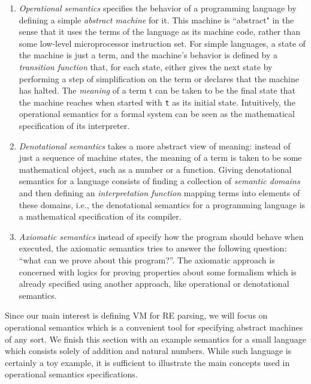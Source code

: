 \documentclass[oneside,12pt]{scrbook}
\theoremstyle{definition}
\theoremstyle{plain}
\theoremstyle{definition}
\begin{document}
\begin{enumerate}
	\item \textit{Operational semantics} specifies the behavior of a programming language by defining a simple \textit{abstract machine}
              for it. This machine is ``abstract" in the sense that it uses the terms of the language as its machine code, rather than some low-level microprocessor instruction set. For simple languages, a state of the machine is just a term, and the machine’s behavior is defined by a \textit{transition function} that, for each state, either gives the next state by performing a step of
              simplification on the term or declares that the machine has halted. The \textit{meaning} of a term t can be taken to be the final  state that the machine reaches when started with \texttt{t} as its initial state. Intuitively, the operational semantics for
              a formal system can be seen as the mathematical specification of its interpreter.
	\item \textit{Denotational semantics} takes a more abstract view of meaning: instead of just a sequence of machine states, the meaning
              of a term is taken to be some mathematical object, such as a number or a function. Giving denotational semantics for a language
              consists of finding a collection of \textit{semantic domains} and then defining an \textit{interpretation function} mapping terms
              into elements of these domains, i.e., the denotational semantics for a programming language is a mathematical specification of
              its compiler.
	\item \textit{Axiomatic semantics} instead of specify how the program should behave when executed, the axiomatic semantics
              tries to answer the following question: ``what can we prove about this program?''. The axiomatic approach is concerned with
              logics for proving properties about some formalism which is already specified using another approach, like operational or
              denotational semantics.
\end{enumerate}

Since our main interest is defining VM for RE parsing, we will focus on operational semantics which is
a convenient tool for specifying abstract machines of any sort. We finish this section with an example semantics for
a small language which consists solely of addition and natural numbers. While such language is certainly a toy example,
it is sufficient to illustrate the main concepts used in operational semantics specifications.
\end{document}
